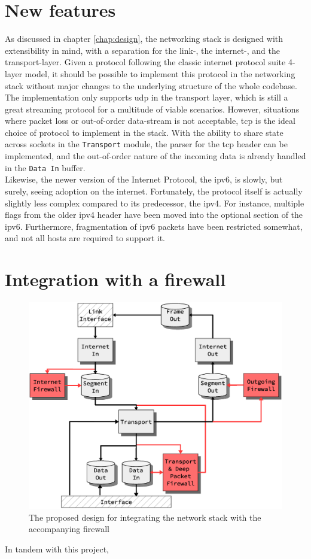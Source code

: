 \section{New features}
As discussed in chapter \ref{chap:design}, the networking stack is designed
with extensibility in mind, with a separation for the link-, the internet-, and
the transport-layer. Given a protocol following the classic internet protocol
suite 4-layer model, it should be possible to implement this protocol in the
networking stack without major changes to the underlying structure of the whole
codebase.\\
The implementation only supports \gls{udp} in the transport layer, which is
still a great streaming protocol for a multitude of viable scenarios. However,
situations where packet loss or out-of-order data-stream is not acceptable,
\gls{tcp} is the ideal choice of protocol to implement in the stack. With the
ability to share state across sockets in the \texttt{Transport} module, the
parser for the \gls{tcp} header can be implemented, and the out-of-order nature
of the incoming data is already handled in the \texttt{Data In} buffer.\\
Likewise, the newer version of the Internet Protocol, the \gls{ipv6}, is slowly, but
surely, seeing adoption on the internet. Fortunately, the protocol itself is
actually slightly less complex compared to its predecessor, the \gls{ipv4}.
For instance, multiple flags from the older \gls{ipv4} header have been moved
into the optional section of the \gls{ipv6}. Furthermore, fragmentation of
\gls{ipv6} packets have been restricted somewhat, and not all hosts are required
to support it\cite{ipv6_proposed}.


\section{Integration with a firewall}
\begin{figure}
\centering
\includegraphics[scale=0.50]{future_work/firewall_integration_design.eps}
\caption{The proposed design for integrating the network stack with the
accompanying firewall}
\label{fig:firewall_integration_design}
\end{figure}


In tandem with this project,
